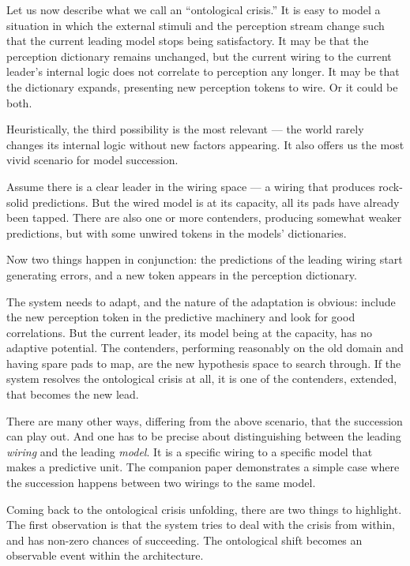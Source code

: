 \documentclass[12pt, a4paper]{article}
\begin{document}
Let us now describe what we call an ``ontological crisis.'' It is easy
to model a situation in which the external stimuli and the perception
stream change such that the current leading model stops being
satisfactory. It may be that the perception dictionary remains
unchanged, but the current wiring to the current leader's internal
logic does not correlate to perception any longer. It may be that the
dictionary expands, presenting new perception tokens to wire. Or it
could be both.

Heuristically, the third possibility is the most relevant --- the world
rarely changes its internal logic without new factors appearing. It also
offers us the most vivid scenario for model succession.

Assume there is a clear leader in the wiring space --- a wiring that
produces rock-solid predictions. But the wired model is at its capacity,
all its pads have already been tapped. There are also one or more
contenders, producing somewhat weaker predictions, but with some unwired
tokens in the models' dictionaries.

Now two things happen in conjunction: the predictions of the leading
wiring start generating errors, and a new token appears in the
perception dictionary.

The system needs to adapt, and the nature of the adaptation is obvious:
include the new perception token in the predictive machinery and look
for good correlations. But the current leader, its model being at the
capacity, has no adaptive potential. The contenders, performing
reasonably on the old domain and having spare pads to map, are the new
hypothesis space to search through. If the system resolves the
ontological crisis at all, it is one of the contenders, extended, that
becomes the new lead.

There are many other ways, differing from the above scenario, that the
succession can play out. And one has to be precise about distinguishing
between the leading \textit{wiring} and the leading \textit{model}. It
is a specific wiring to a specific model that makes a predictive unit.
The companion paper \cite{companion} demonstrates a simple case where the succession
happens between two wirings to the same model.

Coming back to the ontological crisis unfolding, there are two things
to highlight. The first observation is that the system tries to deal
with the crisis from within, and has non-zero chances of succeeding.
The ontological shift becomes an observable event within the
architecture.
\end{document}
